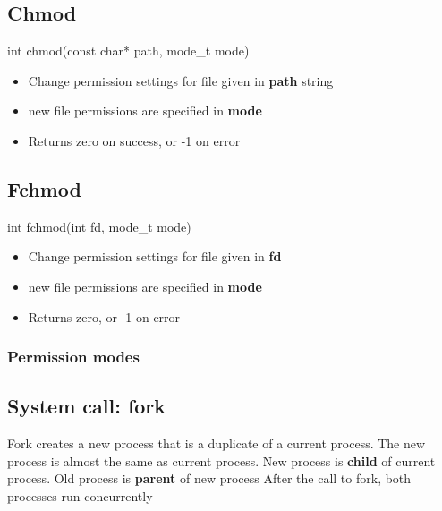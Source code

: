 \documentclass{report}
\begin{document}
        \bigbreak \noindent 
        \subsection{Chmod}
        \bigbreak \noindent 
        \begin{cppcode}
        int chmod(const char* path, mode_t mode)
        \end{cppcode}
        \begin{itemize}
            \item Change permission settings for file given in \textbf{path} string
            \item new file permissions are specified in \textbf{mode}
            \item Returns zero on success, or -1 on error
        \end{itemize}
        \bigbreak \noindent 

        \bigbreak \noindent 
        \subsection{Fchmod}
        \bigbreak \noindent 
        \begin{cppcode}
        int fchmod(int fd, mode_t mode)
        \end{cppcode}
        \begin{itemize}
            \item Change permission settings for file given in \textbf{fd}
            \item new file permissions are specified in \textbf{mode}
            \item Returns zero, or -1 on error
        \end{itemize}
        \bigbreak \noindent 
        \bigbreak \noindent 
        \subsubsection{Permission modes}
        \bigbreak \noindent 

        \pagebreak 
        \bigbreak \noindent 
        \subsection{System call: fork}
        \bigbreak \noindent 
        \begin{concept}
            Fork creates a new process that is a duplicate of a current process. The new process is almost the same as current process.
            \bigbreak \noindent 
            New process is \textbf{child} of current process. Old process is \textbf{parent} of new process
            \bigbreak \noindent 
            After the call to fork, both processes run concurrently
        \end{concept}
        \bigbreak \noindent 
\end{document}

